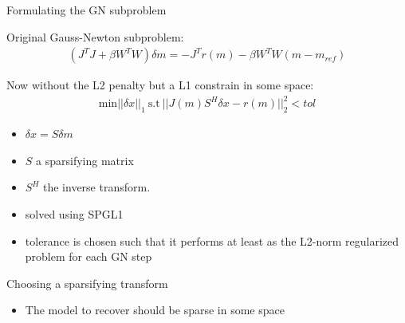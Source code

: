 \documentclass[12pt]{beamer}
\begin{document}
\begin{frame}{Formulating the GN subproblem}

Original Gauss-Newton subproblem:
\begin{align}
(J^TJ+\beta W^TW)\delta m = -J^Tr(m) - \beta W^TW(m-m_{ref})
\end{align}

Now without the L2 penalty but a L1 constrain in some space:
\begin{align}
\text{min} ||\delta x||_1 ~\text{s.t}~ ||J(m)S^H \delta x - r(m)||^2_2 < tol
\end{align}

\begin{itemize}
\item $\delta x = S \delta m$
\item $S$ a sparsifying matrix  
\item $S^H$ the inverse transform.
\item solved using SPGL1
\item tolerance is chosen such that it performs at least as the L2-norm regularized problem for each GN step
\end{itemize}
\end{frame}

\begin{frame}{Choosing a sparsifying transform}
\begin{itemize}
  \item The model to recover should be sparse in some space


\begin{figure}
\end{figure}

\end{itemize}

\end{frame}
\end{document}
